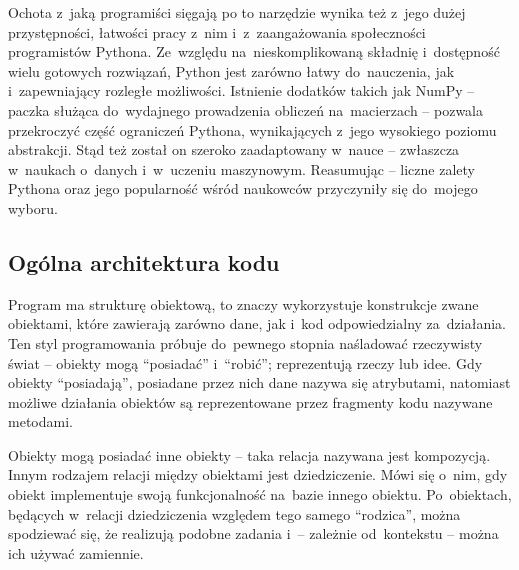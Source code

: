 Ochota z~jaką programiści sięgają po to narzędzie wynika też z~jego dużej przystępności,
  łatwości pracy z~nim i~z~zaangażowania społeczności programistów Pythona.
Ze~względu na~nieskomplikowaną składnię i~dostępność wielu gotowych rozwiązań, Python jest
  zarówno łatwy do~nauczenia, jak i~zapewniający rozległe możliwości.
Istnienie dodatków takich jak NumPy \--- paczka służąca do~wydajnego prowadzenia
  obliczeń na~macierzach \--- pozwala przekroczyć część ograniczeń Pythona, wynikających z~jego
  wysokiego poziomu abstrakcji.
Stąd też został on szeroko zaadaptowany w~nauce \--- zwłaszcza w~naukach o~danych i~w~uczeniu
  maszynowym.
Reasumując \--- liczne zalety Pythona oraz jego popularność wśród naukowców przyczyniły się
  do~mojego wyboru.

\subsection{Ogólna architektura kodu}\label{implementation:architecture}
Program \tesliper{} ma strukturę obiektową, to znaczy wykorzystuje konstrukcje zwane obiektami,
  które zawierają zarówno dane, jak i~kod odpowiedzialny za~działania.
Ten styl programowania próbuje do~pewnego stopnia naśladować rzeczywisty świat \---
  obiekty mogą \enquote{posiadać} i~\enquote{robić}; reprezentują rzeczy lub idee.
Gdy obiekty \enquote{posiadają}, posiadane przez nich dane nazywa się atrybutami,
  natomiast możliwe działania obiektów są reprezentowane przez fragmenty kodu nazywane metodami.

Obiekty mogą posiadać inne obiekty \--- taka relacja nazywana jest kompozycją.
Innym rodzajem relacji między obiektami jest dziedziczenie.
Mówi się o~nim, gdy obiekt implementuje swoją funkcjonalność na~bazie innego obiektu.
Po~obiektach, będących w~relacji dziedziczenia względem tego samego \enquote{rodzica},
  można spodziewać się, że realizują podobne zadania i~\--- zależnie od~kontekstu \--- 
  można ich używać zamiennie.

